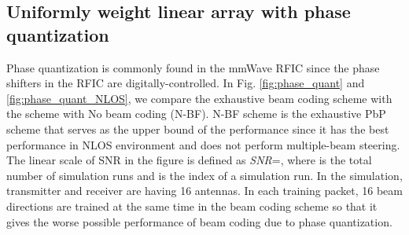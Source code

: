 \documentclass[10pt,conference]{IEEEtran}
\begin{document}
\subsection{Uniformly weight linear array with phase quantization}
Phase quantization is commonly found in the mmWave RFIC since the phase shifters in the RFIC are digitally-controlled. In Fig. \ref{fig:phase_quant} and \ref{fig:phase_quant_NLOS}, we compare the exhaustive beam coding scheme with the scheme with No beam coding (N-BF). N-BF scheme is the exhaustive PbP scheme that serves as the upper bound of the performance since it has the best performance in NLOS environment and does not perform multiple-beam steering. The linear scale of SNR in the figure is defined as \emph{SNR}=, where  is the total number of simulation runs and  is the index of a simulation run. In the simulation, transmitter and receiver are having 16 antennas. In each training packet, 16 beam directions are trained at the same time in the beam coding scheme so that it gives the worse possible performance of beam coding due to phase quantization.
\end{document}

